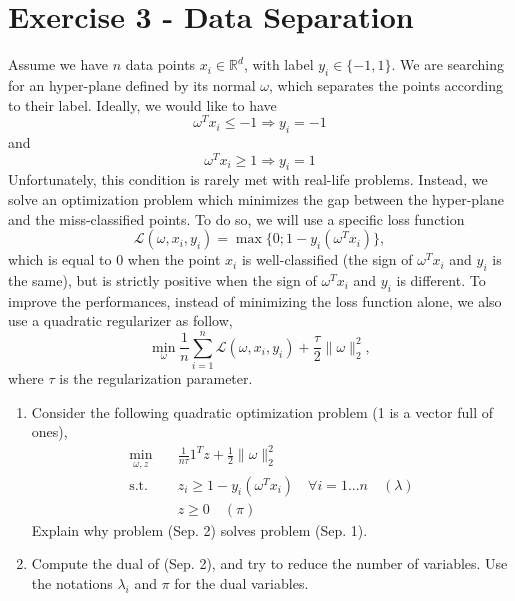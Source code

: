 \documentclass[11pt,a4paper]{article}
\begin{document}
\newpage
\section{Exercise 3 - Data Separation}
Assume we have $n$ data points $x_{i} \in \mathbb{R}^{d}$, with label $y_{i} \in \{-1,1\}$. We are searching for an hyper-plane defined by its normal $\omega$, which separates the points according to their label. Ideally, we would like to have
$$ \omega^{T}x_{i} \le -1 \Rightarrow y_{i} = -1 $$
and
$$ \omega^{T}x_{i} \ge 1 \Rightarrow y_{i} = 1 $$
Unfortunately, this condition is rarely met with real-life problems. Instead, we solve an optimization problem which minimizes the gap between the hyper-plane and the miss-classified points. To do so, we will use a specific loss function
\begin{equation} \label{eq:1} \tag{1}
\mathcal{L}(\omega, x_{i}, y_{i}) = \max\{0; 1 - y_{i}(\omega^{T}x_{i})\} ,
\end{equation}
which is equal to 0 when the point $x_{i}$ is well-classified (the sign of $\omega^{T}x_{i}$ and $y_{i}$ is the same), but is strictly positive when the sign of $\omega^{T}x_{i}$ and $y_{i}$ is different. To improve the performances, instead of minimizing the loss function alone, we also use a quadratic regularizer as follow,
\begin{equation} \tag{Sep. 1}
\min_{\omega} \frac{1}{n} \sum_{i=1}^{n} \mathcal{L}(\omega, x_{i}, y_{i}) + \frac{\tau}{2} \|\omega\|_{2}^{2} ,
\end{equation}
where $\tau$ is the regularization parameter.
\begin{enumerate}
    \item Consider the following quadratic optimization problem (1 is a vector full of ones),
    \begin{equation} \tag{Sep. 2}
    \begin{aligned}
    \min_{\omega,z} \quad & \frac{1}{n\tau} 1^{T}z + \frac{1}{2} \|\omega\|_{2}^{2} \\
    \text{s.t.} \quad & z_{i} \ge 1 - y_{i}(\omega^{T}x_{i}) \quad \forall i=1...n \quad (\lambda) \\
    & z \ge 0 \quad (\pi)
    \end{aligned}
    \end{equation}
    Explain why problem (Sep. 2) solves problem (Sep. 1).
    \item Compute the dual of (Sep. 2), and try to reduce the number of variables. Use the notations $\lambda_{i}$ and $\pi$ for the dual variables.
\end{enumerate}
\end{document}
